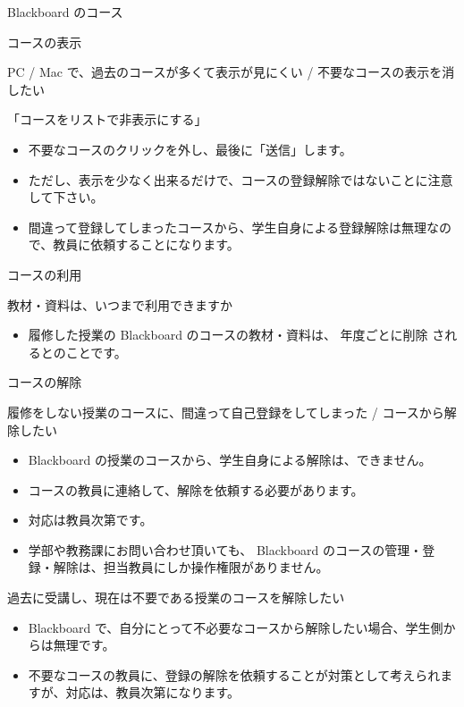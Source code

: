 \documentclass[a4j,10pt]{jsarticle}
\def\lthtmlcheckvsize{\ifdim\ht\sizebox<\vsize 
  \ifdim\wd\sizebox<\hsize\expandafter\hfill\fi \expandafter\vfill
  \else\expandafter\vss\fi}%
\begin{document}
{\begin{frame}[label={sec:org4d8bc57},fragile]{Blackboard のコース}
\begin{block}{コースの表示}
\begin{block}{PC / Mac で、過去のコースが多くて表示が見にくい / 不要なコースの表示を消したい}
\begin{block}{「コースをリストで非表示にする」}
\begin{itemize}
\item 不要なコースのクリックを外し、最後に「送信」します。
\item ただし、表示を少なく出来るだけで、コースの登録解除ではないことに注意して下さい。
\item 間違って登録してしまったコースから、学生自身による登録解除は無理なので、教員に依頼することになります。
\end{itemize}
\end{block}
\end{block}
\end{block}
\par
\begin{block}{コースの利用}
\begin{block}{教材・資料は、いつまで利用できますか}
\begin{itemize}
\item 履修した授業の Blackboard のコースの教材・資料は、 \alert{年度ごとに削除} されるとのことです。
\end{itemize}
\end{block}
\end{block}
\par
\begin{block}{コースの解除}
\begin{block}{履修をしない授業のコースに、間違って自己登録をしてしまった / コースから解除したい}
\begin{itemize}
\item Blackboard の授業のコースから、学生自身による解除は、できません。
\item コースの教員に連絡して、解除を依頼する必要があります。
\item 対応は教員次第です。
\item 学部や教務課にお問い合わせ頂いても、 Blackboard のコースの管理・登録・解除は、担当教員にしか操作権限がありません。
\end{itemize}
\end{block}
\par
\begin{block}{過去に受講し、現在は不要である授業のコースを解除したい}
\begin{itemize}
\item Blackboard で、自分にとって不必要なコースから解除したい場合、学生側からは無理です。
\item 不要なコースの教員に、登録の解除を依頼することが対策として考えられますが、対応は、教員次第になります。
\end{itemize}
\end{block}
\end{block}
\end{frame}%
\lthtmlfigureZ
\lthtmlcheckvsize\clearpage}
\end{document}
